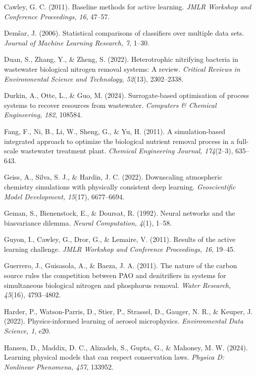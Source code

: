 \documentclass[a4paper,fleqn]{cas-sc}
\begin{document}
\noindent Cawley, G. C. (2011). Baseline methods for active learning. \textit{JMLR Workshop and Conference Proceedings, 16}, 47--57.

\noindent Dem\v{s}ar, J. (2006). Statistical comparisons of classifiers over multiple data sets. \textit{Journal of Machine Learning Research, 7}, 1--30.

\noindent Duan, S., Zhang, Y., \& Zheng, S. (2022). Heterotrophic nitrifying bacteria in wastewater biological nitrogen removal systems: A review. \textit{Critical Reviews in Environmental Science and Technology, 52}(13), 2302--2338.

\noindent Durkin, A., Otte, L., \& Guo, M. (2024). Surrogate-based optimisation of process systems to recover resources from wastewater. \textit{Computers \& Chemical Engineering, 182}, 108584.

\noindent Fang, F., Ni, B., Li, W., Sheng, G., \& Yu, H. (2011). A simulation-based integrated approach to optimize the biological nutrient removal process in a full-scale wastewater treatment plant. \textit{Chemical Engineering Journal, 174}(2--3), 635--643.

\noindent Geiss, A., Silva, S. J., \& Hardin, J. C. (2022). Downscaling atmospheric chemistry simulations with physically consistent deep learning. \textit{Geoscientific Model Development, 15}(17), 6677--6694.

\noindent Geman, S., Bienenstock, E., \& Doursat, R. (1992). Neural networks and the bias\/variance dilemma. \textit{Neural Computation, 4}(1), 1--58.

\noindent Guyon, I., Cawley, G., Dror, G., \& Lemaire, V. (2011). Results of the active learning challenge. \textit{JMLR Workshop and Conference Proceedings, 16}, 19--45.

\noindent Guerrero, J., Guisasola, A., \& Baeza, J. A. (2011). The nature of the carbon source rules the competition between PAO and denitrifiers in systems for simultaneous biological nitrogen and phosphorus removal. \textit{Water Research, 45}(16), 4793--4802.

\noindent Harder, P., Watson-Parris, D., Stier, P., Strassel, D., Gauger, N. R., \& Keuper, J. (2022). Physics-informed learning of aerosol microphysics. \textit{Environmental Data Science, 1}, e20.

\noindent Hansen, D., Maddix, D. C., Alizadeh, S., Gupta, G., \& Mahoney, M. W. (2024). Learning physical models that can respect conservation laws. \textit{Physica D: Nonlinear Phenomena, 457}, 133952.
\end{document}
